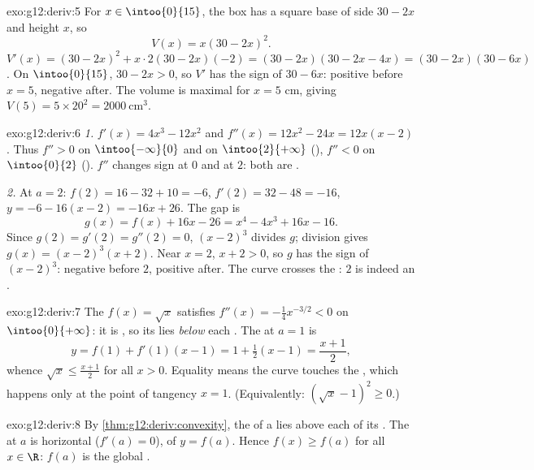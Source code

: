 \begin{solution}{exo:g12:deriv:5}
For $x \in \intoo{0}{15}$, the box has a square base of side $30 - 2x$ and
height $x$, so
\[
V(x) = x(30 - 2x)^2 .
\]
$V'(x) = (30-2x)^2 + x \cdot 2(30-2x)(-2) = (30-2x)(30 - 2x - 4x)
= (30-2x)(30-6x)$. On $\intoo{0}{15}$, $30 - 2x > 0$, so $V'$ has the sign of
$30 - 6x$: positive before $x = 5$, negative after. The volume is maximal for
$x = 5$ cm, giving $V(5) = 5 \times 20^2 = 2000\ \text{cm}^3$.
\end{solution}

\begin{solution}{exo:g12:deriv:6}
\emph{1.} $f'(x) = 4x^3 - 12x^2$ and $f''(x) = 12x^2 - 24x = 12x(x-2)$.
Thus $f'' > 0$ on $\intoo{-\infty}{0}$ and on $\intoo{2}{+\infty}$ (),
$f'' < 0$ on $\intoo{0}{2}$ (). $f''$ changes sign at $0$ and at $2$:
both are .

\emph{2.} At $a = 2$: $f(2) = 16 - 32 + 10 = -6$, $f'(2) = 32 - 48 = -16$,
 $y = -6 - 16(x-2) = -16x + 26$. The gap is
\[
g(x) = f(x) + 16x - 26 = x^4 - 4x^3 + 16x - 16 .
\]
Since $g(2) = g'(2) = g''(2) = 0$, $(x-2)^3$ divides $g$; division gives
$g(x) = (x-2)^3(x+2)$. Near $x = 2$, $x + 2 > 0$, so $g$ has the sign of
$(x-2)^3$: negative before $2$, positive after. The curve crosses the
: $2$ is indeed an .
\end{solution}

\begin{solution}{exo:g12:deriv:7}
The  $f(x) = \sqrt{x}$ satisfies
$f''(x) = -\frac{1}{4}x^{-3/2} < 0$ on $\intoo{0}{+\infty}$: it is ,
so its  lies \emph{below} each . The  at $a = 1$ is
\[
y = f(1) + f'(1)(x - 1) = 1 + \tfrac12 (x-1) = \frac{x+1}{2},
\]
whence $\sqrt{x} \leq \frac{x+1}{2}$ for all $x > 0$. Equality means the
curve touches the , which happens only at the point of tangency
$x = 1$. (Equivalently: $\left(\sqrt x - 1\right)^2 \geq 0$.)
\end{solution}

\begin{solution}{exo:g12:deriv:8}
By \cref{thm:g12:deriv:convexity}, the  of a  
 lies above each of its . The  at $a$ is horizontal
($f'(a) = 0$), of  $y = f(a)$. Hence $f(x) \geq f(a)$ for all
$x \in \R$: $f(a)$ is the global .
\end{solution}

